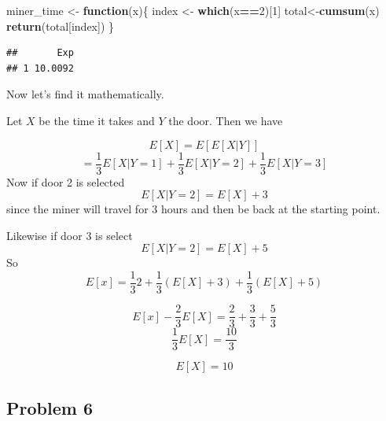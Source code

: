 \documentclass[
]{book}
\newenvironment{Shaded}{\begin{snugshade}}{\end{snugshade}}
\newcommand{\ControlFlowTok}[1]{\textcolor[rgb]{0.13,0.29,0.53}{\textbf{#1}}}
\newcommand{\DataTypeTok}[1]{\textcolor[rgb]{0.13,0.29,0.53}{#1}}
\newcommand{\DecValTok}[1]{\textcolor[rgb]{0.00,0.00,0.81}{#1}}
\newcommand{\KeywordTok}[1]{\textcolor[rgb]{0.13,0.29,0.53}{\textbf{#1}}}
\newcommand{\NormalTok}[1]{#1}
\newcommand{\OperatorTok}[1]{\textcolor[rgb]{0.81,0.36,0.00}{\textbf{#1}}}
\newcommand{\OtherTok}[1]{\textcolor[rgb]{0.56,0.35,0.01}{#1}}
\newcommand{\StringTok}[1]{\textcolor[rgb]{0.31,0.60,0.02}{#1}}
\begin{document}
\begin{Shaded}
\begin{Highlighting}[]
\NormalTok{miner_time <-}\StringTok{ }\ControlFlowTok{function}\NormalTok{(x)\{}
\NormalTok{  index <-}\StringTok{ }\KeywordTok{which}\NormalTok{(x}\OperatorTok{==}\DecValTok{2}\NormalTok{)[}\DecValTok{1}\NormalTok{]}
\NormalTok{  total<-}\KeywordTok{cumsum}\NormalTok{(x)}
  \KeywordTok{return}\NormalTok{(total[index])}
\NormalTok{\}}
\end{Highlighting}
\end{Shaded}

\begin{Shaded}
\end{Shaded}

\begin{verbatim}
##       Exp
## 1 10.0092
\end{verbatim}

Now let's find it mathematically.

Let \(X\) be the time it takes and \(Y\) the door. Then we have

\[E[X] = E[E[X|Y]] \]
\[ = \frac{1}{3}E[X|Y=1]+\frac{1}{3}E[X|Y=2]+\frac{1}{3}E[X|Y=3]\]
Now if door 2 is selected
\[E[X|Y=2]=E[X]+3\]
since the miner will travel for 3 hours and then be back at the starting point.

Likewise if door 3 is select
\[E[X|Y=2]=E[X]+5\]
So
\[ E[x]= \frac{1}{3}2+\frac{1}{3}\left( E[X]+3 \right)+\frac{1}{3}\left( E[X]+5 \right)\]

\[E[x] -  \frac{2}{3}E[X] = \frac{2}{3}+\frac{3}{3}+\frac{5}{3}\]
\[\frac{1}{3}E[X]=\frac{10}{3}\]

\[E[X]=10\]

\hypertarget{problem-6-3}{%
\subsection{Problem 6}\label{problem-6-3}}
\end{document}

